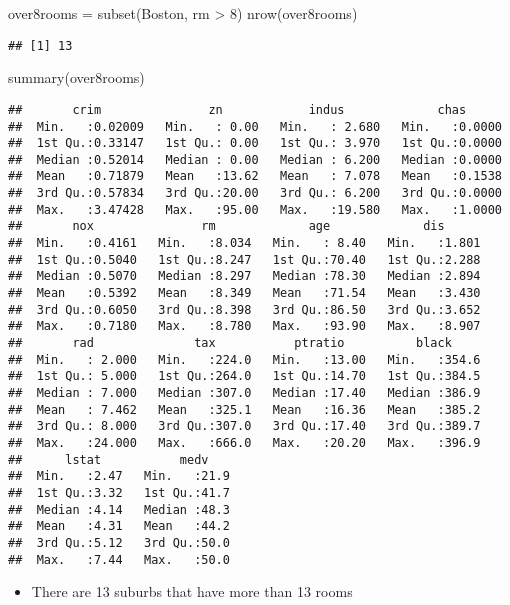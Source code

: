 \documentclass[
]{article}
\newenvironment{Shaded}{\begin{snugshade}}{\end{snugshade}}
\newcommand{\DecValTok}[1]{\textcolor[rgb]{0.00,0.00,0.81}{#1}}
\newcommand{\FunctionTok}[1]{\textcolor[rgb]{0.00,0.00,0.00}{#1}}
\newcommand{\NormalTok}[1]{#1}
\newcommand{\OtherTok}[1]{\textcolor[rgb]{0.56,0.35,0.01}{#1}}
\newcommand{\SpecialCharTok}[1]{\textcolor[rgb]{0.00,0.00,0.00}{#1}}
\providecommand{\tightlist}{%
  \setlength{\itemsep}{0pt}\setlength{\parskip}{0pt}}
\begin{document}
\begin{Shaded}
\begin{Highlighting}[]
\NormalTok{over8rooms }\OtherTok{=} \FunctionTok{subset}\NormalTok{(Boston, rm }\SpecialCharTok{\textgreater{}} \DecValTok{8}\NormalTok{)}
\FunctionTok{nrow}\NormalTok{(over8rooms)}
\end{Highlighting}
\end{Shaded}

\begin{verbatim}
## [1] 13
\end{verbatim}

\begin{Shaded}
\begin{Highlighting}[]
\FunctionTok{summary}\NormalTok{(over8rooms)}
\end{Highlighting}
\end{Shaded}

\begin{verbatim}
##       crim               zn            indus             chas       
##  Min.   :0.02009   Min.   : 0.00   Min.   : 2.680   Min.   :0.0000  
##  1st Qu.:0.33147   1st Qu.: 0.00   1st Qu.: 3.970   1st Qu.:0.0000  
##  Median :0.52014   Median : 0.00   Median : 6.200   Median :0.0000  
##  Mean   :0.71879   Mean   :13.62   Mean   : 7.078   Mean   :0.1538  
##  3rd Qu.:0.57834   3rd Qu.:20.00   3rd Qu.: 6.200   3rd Qu.:0.0000  
##  Max.   :3.47428   Max.   :95.00   Max.   :19.580   Max.   :1.0000  
##       nox               rm             age             dis       
##  Min.   :0.4161   Min.   :8.034   Min.   : 8.40   Min.   :1.801  
##  1st Qu.:0.5040   1st Qu.:8.247   1st Qu.:70.40   1st Qu.:2.288  
##  Median :0.5070   Median :8.297   Median :78.30   Median :2.894  
##  Mean   :0.5392   Mean   :8.349   Mean   :71.54   Mean   :3.430  
##  3rd Qu.:0.6050   3rd Qu.:8.398   3rd Qu.:86.50   3rd Qu.:3.652  
##  Max.   :0.7180   Max.   :8.780   Max.   :93.90   Max.   :8.907  
##       rad              tax           ptratio          black      
##  Min.   : 2.000   Min.   :224.0   Min.   :13.00   Min.   :354.6  
##  1st Qu.: 5.000   1st Qu.:264.0   1st Qu.:14.70   1st Qu.:384.5  
##  Median : 7.000   Median :307.0   Median :17.40   Median :386.9  
##  Mean   : 7.462   Mean   :325.1   Mean   :16.36   Mean   :385.2  
##  3rd Qu.: 8.000   3rd Qu.:307.0   3rd Qu.:17.40   3rd Qu.:389.7  
##  Max.   :24.000   Max.   :666.0   Max.   :20.20   Max.   :396.9  
##      lstat           medv     
##  Min.   :2.47   Min.   :21.9  
##  1st Qu.:3.32   1st Qu.:41.7  
##  Median :4.14   Median :48.3  
##  Mean   :4.31   Mean   :44.2  
##  3rd Qu.:5.12   3rd Qu.:50.0  
##  Max.   :7.44   Max.   :50.0
\end{verbatim}

\begin{itemize}
\tightlist
\item
  There are 13 suburbs that have more than 13 rooms
\end{itemize}
\end{document}
